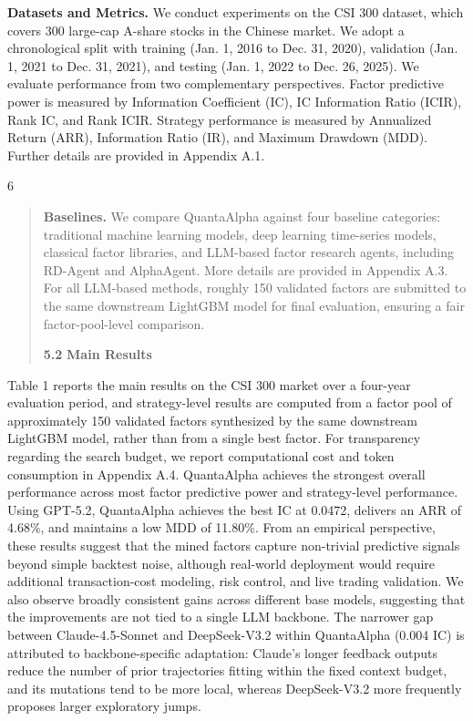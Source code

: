 \documentclass[
]{article}
\begin{document}
\textbf{Datasets and Metrics.} We conduct experiments on the CSI 300
dataset, which covers 300 large-cap A-share stocks in the Chinese
market. We adopt a chronological split with training (Jan. 1, 2016 to
Dec. 31, 2020), validation (Jan. 1, 2021 to Dec. 31, 2021), and testing
(Jan. 1, 2022 to Dec. 26, 2025). We evaluate performance from two
complementary perspectives. Factor predictive power is measured by
Information Coefficient (IC), IC Information Ratio (ICIR), Rank IC, and
Rank ICIR. Strategy performance is measured by Annualized Return (ARR),
Information Ratio (IR), and Maximum Drawdown (MDD). Further details are
provided in Appendix A.1.

6

\begin{quote}
\textbf{Baselines.} We compare QuantaAlpha against four baseline
categories: traditional machine learning models, deep learning
time-series models, classical factor libraries, and LLM-based factor
research agents, including RD-Agent and AlphaAgent. More details are
provided in Appendix A.3. For all LLM-based methods, roughly 150
validated factors are submitted to the same downstream LightGBM model
for final evaluation, ensuring a fair factor-pool-level comparison.

\textbf{5.2} \textbf{Main Results}
\end{quote}

Table 1 reports the main results on the CSI 300 market over a four-year
evaluation period, and strategy-level results are computed from a factor
pool of approximately 150 validated factors synthesized by the same
downstream LightGBM model, rather than from a single best factor. For
transparency regarding the search budget, we report computational cost
and token consumption in Appendix A.4. QuantaAlpha achieves the
strongest overall performance across most factor predictive power and
strategy-level performance. Using GPT-5.2, QuantaAlpha achieves the best
IC at 0.0472, delivers an ARR of 4.68\%, and maintains a low MDD of
11.80\%. From an empirical perspective, these results suggest that the
mined factors capture non-trivial predictive signals beyond simple
backtest noise, although real-world deployment would require additional
transaction-cost modeling, risk control, and live trading validation. We
also observe broadly consistent gains across different base models,
suggesting that the improvements are not tied to a single LLM backbone.
The narrower gap between Claude-4.5-Sonnet and DeepSeek-V3.2 within
QuantaAlpha (0.004 IC) is attributed to backbone-specific adaptation:
Claude's longer feedback outputs reduce the number of prior trajectories
fitting within the fixed context budget, and its mutations tend to be
more local, whereas DeepSeek-V3.2 more frequently proposes larger
exploratory jumps.
\end{document}
